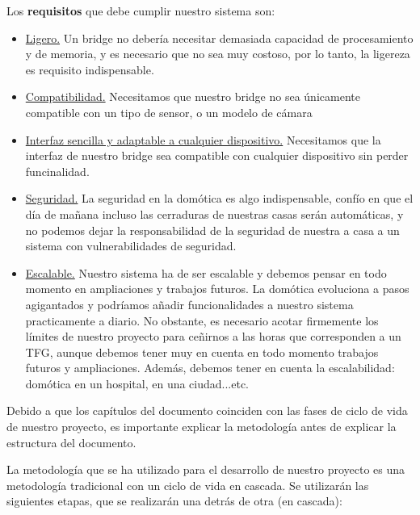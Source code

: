 Los \textbf{requisitos} que debe cumplir nuestro sistema son:
\begin{itemize}
  \item \underline{Ligero.} Un bridge no debería necesitar demasiada capacidad de procesamiento y de memoria, y es necesario que no sea muy costoso, por lo tanto, la ligereza es requisito indispensable.
  \item \underline{Compatibilidad.} Necesitamos que nuestro bridge no sea únicamente compatible con un tipo de sensor, o un modelo de cámara
  \item \underline{Interfaz sencilla y adaptable a cualquier dispositivo.} Necesitamos que la interfaz de nuestro bridge sea compatible con cualquier dispositivo sin perder funcinalidad.
  \item \underline{Seguridad.} La seguridad en la domótica es algo indispensable, confío en que el día de mañana incluso las cerraduras de nuestras casas serán automáticas, y no podemos dejar la responsabilidad de la seguridad
  de nuestra a casa a un sistema con vulnerabilidades de seguridad.
  \item \underline{Escalable.} Nuestro sistema ha de ser escalable y debemos pensar en todo momento en ampliaciones y trabajos futuros. La domótica evoluciona a pasos agigantados y podríamos añadir funcionalidades a nuestro 
  sistema practicamente a diario. No obstante, es necesario acotar firmemente los límites de nuestro proyecto para ceñirnos a las horas que corresponden a un TFG, aunque debemos tener muy en cuenta en todo momento trabajos futuros y ampliaciones.
  Además, debemos tener en cuenta la escalabilidad: domótica en un hospital, en una ciudad...etc.
\end{itemize}



Debido a que los capítulos del documento coinciden con las fases de ciclo de vida de nuestro proyecto, es importante explicar la metodología antes de explicar la estructura del documento.
\par
La metodología que se ha utilizado para el desarrollo de nuestro proyecto es una metodología tradicional con un ciclo de vida en cascada. Se utilizarán las siguientes etapas, que se realizarán una detrás de otra (en cascada):

